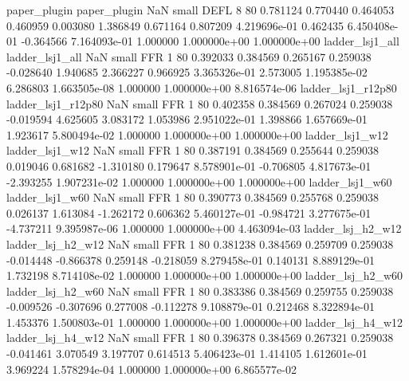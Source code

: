             paper_plugin             paper_plugin                   NaN      small     DEFL                 8 80 0.781124       0.770440 0.464053       0.460959    0.003080      1.386849      0.671164     0.807209   4.219696e-01  0.462435 6.450408e-01    -0.364566   7.164093e-01            1.000000    1.000000e+00        1.000000e+00
         ladder_lsj1_all          ladder_lsj1_all                   NaN      small      FFR                 1 80 0.392033       0.384569 0.265167       0.259038   -0.028640      1.940685      2.366227     0.966925   3.365326e-01  2.573005 1.195385e-02     6.286803   1.663505e-08            1.000000    1.000000e+00        8.816574e-06
      ladder_lsj1_r12p80       ladder_lsj1_r12p80                   NaN      small      FFR                 1 80 0.402358       0.384569 0.267024       0.259038   -0.019594      4.625605      3.083172     1.053986   2.951022e-01  1.398866 1.657669e-01     1.923617   5.800494e-02            1.000000    1.000000e+00        1.000000e+00
         ladder_lsj1_w12          ladder_lsj1_w12                   NaN      small      FFR                 1 80 0.387191       0.384569 0.255644       0.259038    0.019046      0.681682     -1.310180     0.179647   8.578901e-01 -0.706805 4.817673e-01    -2.393255   1.907231e-02            1.000000    1.000000e+00        1.000000e+00
         ladder_lsj1_w60          ladder_lsj1_w60                   NaN      small      FFR                 1 80 0.390773       0.384569 0.255768       0.259038    0.026137      1.613084     -1.262172     0.606362   5.460127e-01 -0.984721 3.277675e-01    -4.737211   9.395987e-06            1.000000    1.000000e+00        4.463094e-03
       ladder_lsj_h2_w12        ladder_lsj_h2_w12                   NaN      small      FFR                 1 80 0.381238       0.384569 0.259709       0.259038   -0.014448     -0.866378      0.259148    -0.218059   8.279458e-01  0.140131 8.889129e-01     1.732198   8.714108e-02            1.000000    1.000000e+00        1.000000e+00
       ladder_lsj_h2_w60        ladder_lsj_h2_w60                   NaN      small      FFR                 1 80 0.383386       0.384569 0.259755       0.259038   -0.009526     -0.307696      0.277008    -0.112278   9.108879e-01  0.212468 8.322894e-01     1.453376   1.500803e-01            1.000000    1.000000e+00        1.000000e+00
       ladder_lsj_h4_w12        ladder_lsj_h4_w12                   NaN      small      FFR                 1 80 0.396378       0.384569 0.267321       0.259038   -0.041461      3.070549      3.197707     0.614513   5.406423e-01  1.414105 1.612601e-01     3.969224   1.578294e-04            1.000000    1.000000e+00        6.865577e-02
